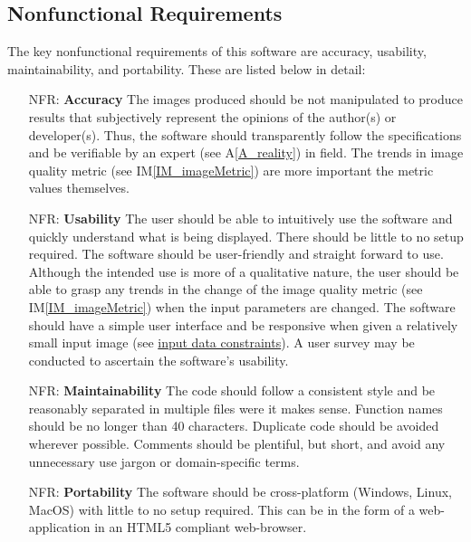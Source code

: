 \documentclass[12pt]{article}
\newcommand{\aref}[1]{A\ref{#1}}
\newcommand{\iref}[1]{IM\ref{#1}}
\newcounter{nfrnum} %
\begin{document}
\subsection{Nonfunctional Requirements}

The key nonfunctional requirements of this software are accuracy, usability, 
maintainability, and portability. These are listed below in detail:

\noindent \begin{itemize}

\item[NFR\refstepcounter{nfrnum}\thenfrnum \label{NFR_Accuracy}:]
  \textbf{Accuracy} The images produced should be not manipulated to produce 
  results that subjectively represent the opinions of the author(s) or 
  developer(s). Thus, the software should transparently follow the 
  specifications and be verifiable by an expert (see \aref{A_reality}) in field. The trends in image 
  quality metric (see \iref{IM_imageMetric}) are more important the metric values themselves.

\item[NFR\refstepcounter{nfrnum}\thenfrnum \label{NFR_Usability}:] \textbf{Usability} The user should be able to intuitively use the 
  software and quickly understand what is being displayed. There should be 
  little to no setup required. The software should be user-friendly and straight forward to use.
  Although the intended use is more of a qualitative nature, the user should be able to grasp any 
  trends in the change of the image quality metric (see \iref{IM_imageMetric}) when the input parameters are 
  changed. The software should have a simple user interface and be responsive 
  when given a relatively small input image (see \hyperref[sec_DataConstraints]{input data constraints}).
  A user survey may be conducted to ascertain the software's usability.

\item[NFR\refstepcounter{nfrnum}\thenfrnum \label{NFR_Maintainability}:]
  \textbf{Maintainability} The code should follow a consistent style and
  be reasonably separated in multiple files were it makes sense. Function names 
  should be no longer than 40 characters. Duplicate code should be avoided 
  wherever possible. Comments should be plentiful, but short, and avoid any 
  unnecessary use jargon or domain-specific terms.

\item[NFR\refstepcounter{nfrnum}\thenfrnum \label{NFR_Portability}:]
  \textbf{Portability} The software should be cross-platform (Windows, Linux, 
  MacOS) with little to no setup required. This can be in the form of a 
  web-application in an HTML5 compliant web-browser.

\end{itemize}
\end{document}
